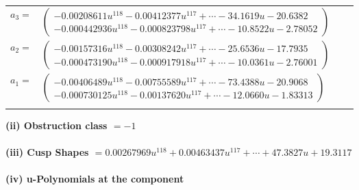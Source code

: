 \documentclass[1p]{elsarticle_modified}
\theoremstyle{definition}
\begin{document}
\begin{tabular}{m{7pt} m{180pt} m{7pt} m{180pt} }
\flushright $a_{3}=$&$\begin{pmatrix}-0.00208611 u^{118}-0.00412377 u^{117}+\cdots-34.1619 u-20.6382\\-0.000442936 u^{118}-0.000823798 u^{117}+\cdots-10.8522 u-2.78052\end{pmatrix}$ \\
\flushright $a_{2}=$&$\begin{pmatrix}-0.00157316 u^{118}-0.00308242 u^{117}+\cdots-25.6536 u-17.7935\\-0.000473190 u^{118}-0.000917918 u^{117}+\cdots-10.0361 u-2.76001\end{pmatrix}$ \\
\flushright $a_{1}=$&$\begin{pmatrix}-0.00406489 u^{118}-0.00755589 u^{117}+\cdots-73.4388 u-20.9068\\-0.000730125 u^{118}-0.00137620 u^{117}+\cdots-12.0660 u-1.83313\end{pmatrix}$\\&\end{tabular}
\flushleft \textbf{(ii) Obstruction class $= -1$}\\~\\
\flushleft \textbf{(iii) Cusp Shapes $= 0.00267969 u^{118}+0.00463437 u^{117}+\cdots+47.3827 u+19.3117$}\\~\\
\newpage\renewcommand{\arraystretch}{1}
\flushleft \textbf{(iv) u-Polynomials at the component}\newline \\
\end{document}
